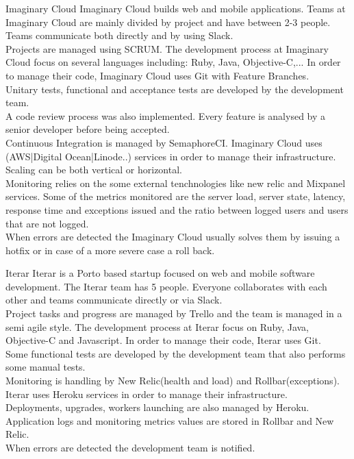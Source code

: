     \begin{companyreport}{Imaginary Cloud}
      \product
      Imaginary Cloud builds web and mobile applications.
      \teams
      Teams at Imaginary Cloud are mainly divided by project and have between 2-3  people. Teams communicate both directly and by using Slack. \\
      Projects are managed using SCRUM.
      \development
      The development process at Imaginary Cloud focus on several languages including: Ruby, Java, Objective-C,... In order to manage their code, Imaginary Cloud uses Git with Feature Branches. \\
      Unitary tests, functional and acceptance tests are developed by the development team. \\
      A code review process was also implemented. Every feature is analysed by a senior developer before being accepted. \\
      Continuous Integration is managed by SemaphoreCI.
      \operations
      Imaginary Cloud uses (AWS|Digital Ocean|Linode..) services in order to manage their infrastructure. Scaling can be both vertical or horizontal. \\
      Monitoring relies on the some external tenchnologies like new relic and Mixpanel services.  Some of the metrics monitored are the  server load, server state, latency, response time and exceptions issued and the ratio between logged users and users that are not logged. \\
      When errors are detected the Imaginary Cloud usually solves them by issuing a hotfix or in case of a more severe case a roll back.
      \reportend
    \end{companyreport}

    \begin{companyreport}{Iterar}
      \product
      Iterar is a Porto based startup focused on web and mobile software development.
      \teams
      The Iterar team has 5 people. Everyone collaborates with each other and teams communicate directly or via Slack. \\
      Project tasks and progress are managed by Trello and the team is managed in a semi agile style.
      \development
      The development process at Iterar focus on Ruby, Java, Objective-C and Javascript. In order to manage their code, Iterar uses Git.  \\
      Some functional tests are developed by the development team that also performs some manual tests. \\
      \operations
      Monitoring is handling by New Relic(health and load) and Rollbar(exceptions). \\
      Iterar uses Heroku services in order to manage their infrastructure.  \\
      Deployments, upgrades, workers launching are also managed by Heroku. \\
      Application logs and monitoring metrics values are stored in Rollbar and New Relic. \\
      When errors are detected the development team is notified.
      \reportend
    \end{companyreport}

